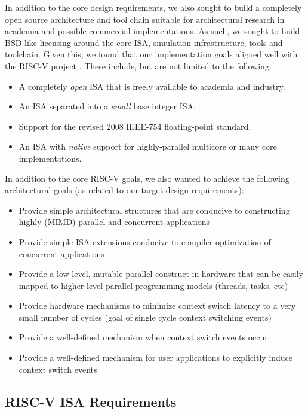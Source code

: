 \documentclass{article}
\begin{document}
In addition to the core design requirements, we also sought to build a
completely open source architecture and tool chain suitable for architectural 
research in academia and possible commercial implementations.  As such, we sought
to build BSD-like licensing around the core ISA, simulation infrastructure, tools
and toolchain.  Given this, we found that our implementation goals aligned 
well with the RISC-V project \cite{Waterman:EECS-2014-54}.  These include, but are
not limited to the following: 

\begin{itemize}
\item A completely \emph{open} ISA that is freely available to academia and industry.
\item An ISA separated into a \emph{small} base integer ISA. 
\item Support for the revised 2008 IEEE-754 \cite{2008IEEE} floating-point standard.
\item An ISA with \emph{native} support for highly-parallel multicore or many core
implementations.  
\end{itemize}

In addition to the core RISC-V goals, we also wanted to achieve the following
architectural goals (as related to our target design requirements): 

\begin{itemize}
\item Provide simple architectural structures that are conducive to constructing
  highly (MIMD) parallel and concurrent applications
\item Provide simple ISA extensions conducive to compiler optimization of
concurrent applications
\item Provide a low-level, mutable parallel construct in hardware that can
  be easily mapped to higher level parallel programming models (threads, tasks, etc)
\item Provide hardware mechanisms to minimize context switch latency to a very small
  number of cycles (goal of single cycle context switching events)
\item Provide a well-defined mechanism when context switch events occur
\item Provide a well-defined mechanism for user applications to explicitly induce
  context switch events
\end{itemize}

\subsection{RISC-V ISA Requirements}
\end{document}

